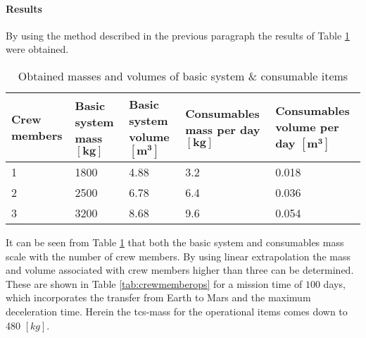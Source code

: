 \paragraph{Results}
By using the method described in the previous paragraph the results of Table \ref{tab:operationalest} were obtained.
\begin{table}[h]
	\centering
	\caption{Obtained masses and volumes of basic system \& consumable items}
	\begin{tabular}{|p{1.87cm}|p{2.625cm}|p{2.65cm}|p{3.6cm}|p{3.6cm}|}
		\hline
		\textbf{Crew members} & \textbf{Basic system mass $\mathbf{[kg]}$} & \textbf{Basic system volume $\mathbf{[m^{3}]}$} & \textbf{Consumables mass per day $\mathbf{[kg]}$} & \textbf{Consumables volume per day $\mathbf{[m^{3}]}$} \\ \hline \hline
		1 & 1800 & 4.88 & 3.2 & 0.018 \\
		2 & 2500 & 6.78 & 6.4 & 0.036 \\
		3 & 3200 & 8.68 & 9.6 & 0.054 \\
		\hline
	\end{tabular}
	\label{tab:operationalest}
\end{table}
It can be seen from Table \ref{tab:operationalest} that both the basic system and consumables mass scale with the number of crew members. By using linear extrapolation the mass and volume associated with crew members higher than three can be determined. These are shown in Table \ref{tab:crewmemberops} for a mission time of $100$ days, which incorporates the transfer from Earth to Mars and the maximum deceleration time. Herein the \gls{tcs}-mass for the operational items comes down to 480 $[kg]$.\\

